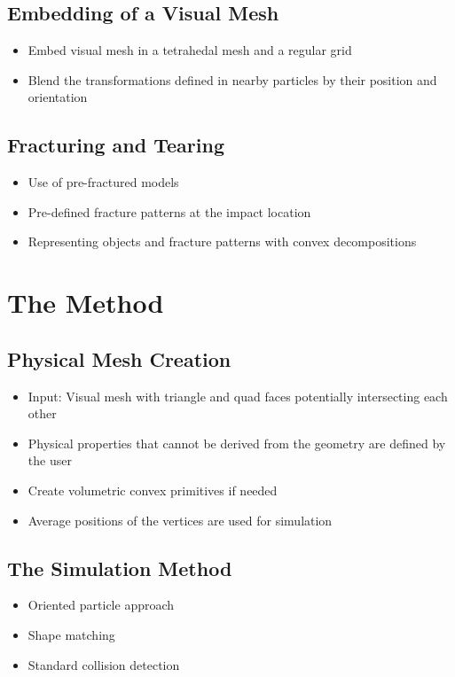 \documentclass[
	11pt, 
	DIV10,
	a4paper, 
	oneside, 
	headings=normal, 
	captions=tableheading,
	final, 
	numbers=noenddot
]{scrartcl}
\begin{document}
\subsection{Embedding of a Visual Mesh}
	\begin{itemize}
		\item Embed visual mesh in a tetrahedal mesh and a regular grid
		\item Blend the transformations defined in nearby particles by their position and orientation
	\end{itemize}
\subsection{Fracturing and Tearing}
	\begin{itemize}
		\item Use of pre-fractured models
		\item Pre-defined fracture patterns at the impact location
		\item Representing objects and fracture patterns with convex decompositions
	\end{itemize}
\section{The Method}

\subsection{Physical Mesh Creation}
	\begin{itemize}
		\item Input: Visual mesh with triangle and quad faces potentially intersecting each other
		\item Physical properties that cannot be derived from the geometry are defined by the user
		\item Create volumetric convex primitives if needed
		\item Average positions of the vertices are used for simulation
	\end{itemize}
\subsection{The Simulation Method}
	\begin{itemize}
		\item Oriented particle approach
		\item Shape matching
		\item Standard collision detection
	\end{itemize}
\end{document}
